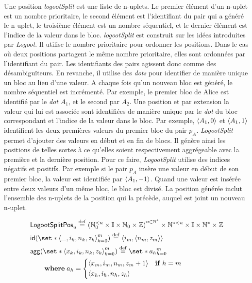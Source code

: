 Une position \emph{logootSplit} est une liste de n-uplets.
Le premier élément d'un n-uplet est un nombre prioritaire, le second élément est l'identifiant du pair qui a généré le n-uplet, le troisième élément est un nombre séquentiel, et le dernier élément est l'indice de la valeur dans le bloc.
\emph{logootSplit} est construit sur les idées introduites par \emph{Logoot}.
Il utilise le nombre prioritaire pour ordonner les positions.
Dans le cas où deux positions partagent le même nombre prioritaire, elles sont ordonnées par l'identifiant du pair.
Les identifiants des pairs agissent donc comme des désambiguïteurs.
En revanche, il utilise des \emph{dots} pour identifier de manière unique un bloc au lieu d'une valeur.
A chaque fois qu'un nouveau bloc est généré, le nombre séquentiel est incrémenté.
Par exemple, le premier bloc de Alice est identifié par le \emph{dot} $A_1$, et le second par $A_2$.
Une position et par extension la valeur qui lui est associée sont identifiées de manière unique par le \emph{dot} du bloc correspondant et l'indice de la valeur dans le bloc.
Par exemple, $\tuple*{A_1,0}$ et $\tuple*{A_1,1}$ identifient les deux premières valeurs du premier bloc du pair $p_A$.
\emph{LogootSplit} permet d'ajouter des valeurs en début et en fin de blocs.
Il génère ainsi les positions de telles sortes à ce qu'elles soient respectivement aggrégeable avec la première et la dernière position.
Pour ce faire, \emph{LogootSplit} utilise des indices négatifs et positifs.
Par exemple si le pair $p_A$ insère une valeur en début de son premier bloc, la valeur est identifiée par $\tuple*{A_1,-1}$.
Quand une valeur est insérée entre deux valeurs d'un même bloc, le bloc est divisé.
La position générée inclut l'ensemble des n-uplets de la position qui la précède, auquel est joint un nouveau n-uplet.

\begin{align}
&\trm{LogootSplitPos}_u \defeq {(\mathbb{N}_0^{< u} \times \mathbb{I} \times \mathbb{N}_0 \times \mathbb{Z})}^{n \in \mathbb{N}^*} \times \mathbb{N}^{* < u} \times \mathbb{I} \times \mathbb{N}^* \times \mathbb{Z}\\
&\trm{id}(\set*{\tuple*{\_, i_k, n_k, z_k}}_{k=0}^m) \defeq \tuple*{i_m, \tuple*{n_m, z_m}}\\
&\begin{aligned}
    \MoveEqLeft \trm{agg}(\set*{\tuple*{x_k, i_k, n_k, z_k}}_{k=0}^m) \defeq \set*{a_h}_{h=0}^m\\
    &\where a_h = \begin{dcases}
        \tuple*{x_m, i_m, n_m, z_m + 1} & \when h = m\\
        \tuple*{x_h, i_h, n_h, z_h}
    \end{dcases}
\end{aligned}
\end{align}


